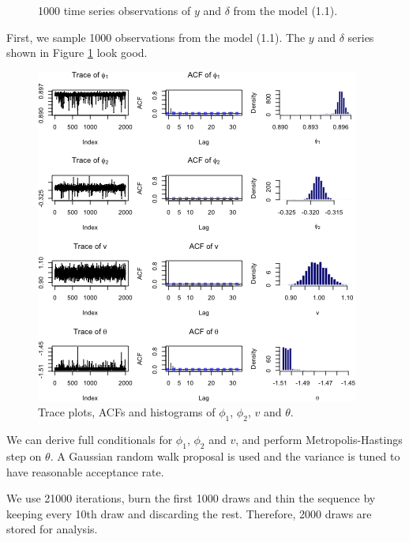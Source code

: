 \documentclass[12pt]{article}\usepackage[]{graphicx}\usepackage[]{color}
\newenvironment{knitrout}{}{} %
\begin{document}
\begin{enumerate}
\begin{figure}
\begin{knitrout}
{}



\end{knitrout}
		\caption{1000 time series observations of $y$ and $\delta$ from the model (1.1).}
		\label{Q5a_plot}
	\end{figure}

	First, we sample 1000 observations from the model (1.1). The $y$ and $\delta$ series shown in Figure \ref{Q5a_plot} look good.
	

	\begin{figure}
\begin{knitrout}
\color{fgcolor}

{\centering \includegraphics[width=.8\linewidth]{figure/hw1_Q5MCMCplot-1} 

}



\end{knitrout}
		\caption{Trace plots, ACFs and histograms of $\phi_1$, $\phi_2$, $v$ and $\theta$.}
		\label{Q5MCMCplot}
	\end{figure}
	
	We can derive full conditionals for $\phi_1$, $\phi_2$ and $v$, and perform Metropolis-Hastings step on $\theta$. A Gaussian random walk proposal is used and the variance is tuned to have reasonable acceptance rate.
	
	We use 21000 iterations, burn the first 1000 draws and thin the sequence by keeping every 10th draw and discarding the rest. Therefore, 2000 draws are stored for analysis. 
	

\end{enumerate}
\end{document}
